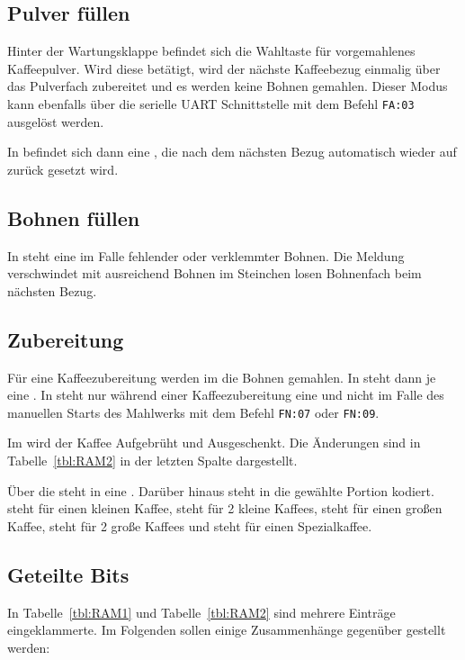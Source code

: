 \subsection{Pulver füllen}
Hinter der Wartungsklappe befindet sich die Wahltaste für vorgemahlenes Kaffeepulver.
Wird diese betätigt, wird der nächste Kaffeebezug einmalig über das Pulverfach zubereitet und es werden keine Bohnen gemahlen.
Dieser Modus kann ebenfalls über die serielle \ac{UART} Schnittstelle mit dem Befehl \texttt{FA:03} ausgelöst werden.

In  befindet sich dann eine , die nach dem nächsten Bezug automatisch wieder auf  zurück gesetzt wird.

\subsection{Bohnen füllen}
In  steht eine  im Falle fehlender oder verklemmter Bohnen.
Die Meldung verschwindet mit ausreichend Bohnen im Steinchen losen Bohnenfach beim nächsten Bezug.

\subsection{Zubereitung}\label{subsec:RAM:Zubereitung} %
Für eine Kaffeezubereitung werden im  die Bohnen gemahlen.
In  steht dann je eine .
In  steht nur während einer Kaffeezubereitung eine  und nicht im Falle des manuellen Starts des Mahlwerks mit dem Befehl \texttt{FN:07} oder \texttt{FN:09}.

Im  wird der Kaffee Aufgebrüht und Ausgeschenkt.
Die Änderungen sind in Tabelle~\ref{tbl:RAM2} in der letzten Spalte dargestellt.

Über die  steht in  eine .
Darüber hinaus steht in  die gewählte Portion kodiert.
 steht für einen kleinen Kaffee,  steht für 2 kleine Kaffees,  steht für einen großen Kaffee,  steht für 2 große Kaffees und  steht für einen Spezialkaffee.

\subsection{Geteilte Bits}
In Tabelle~\ref{tbl:RAM1} und Tabelle~\ref{tbl:RAM2} sind mehrere Einträge eingeklammerte.
Im Folgenden sollen einige Zusammenhänge gegenüber gestellt werden:

